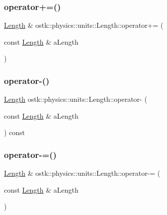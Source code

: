\mbox{\label{classostk_1_1physics_1_1units_1_1_length_a7903485eb0e4d3f92cdbd8436ecb5adc}} 
\subsubsection{\texorpdfstring{operator+=()}{operator+=()}}
{\footnotesize\ttfamily \hyperlink{classostk_1_1physics_1_1units_1_1_length}{Length} \& ostk\+::physics\+::units\+::\+Length\+::operator+= (\begin{DoxyParamCaption}\item[{const \hyperlink{classostk_1_1physics_1_1units_1_1_length}{Length} \&}]{a\+Length }\end{DoxyParamCaption})}

\mbox{\label{classostk_1_1physics_1_1units_1_1_length_a7ead71a73994b72fea9cbee1763c921f}} 
\subsubsection{\texorpdfstring{operator-\/()}{operator-()}}
{\footnotesize\ttfamily \hyperlink{classostk_1_1physics_1_1units_1_1_length}{Length} ostk\+::physics\+::units\+::\+Length\+::operator-\/ (\begin{DoxyParamCaption}\item[{const \hyperlink{classostk_1_1physics_1_1units_1_1_length}{Length} \&}]{a\+Length }\end{DoxyParamCaption}) const}

\mbox{\label{classostk_1_1physics_1_1units_1_1_length_a9006163f65f5bb808a4956d5302f3802}} 
\subsubsection{\texorpdfstring{operator-\/=()}{operator-=()}}
{\footnotesize\ttfamily \hyperlink{classostk_1_1physics_1_1units_1_1_length}{Length} \& ostk\+::physics\+::units\+::\+Length\+::operator-\/= (\begin{DoxyParamCaption}\item[{const \hyperlink{classostk_1_1physics_1_1units_1_1_length}{Length} \&}]{a\+Length }\end{DoxyParamCaption})}

